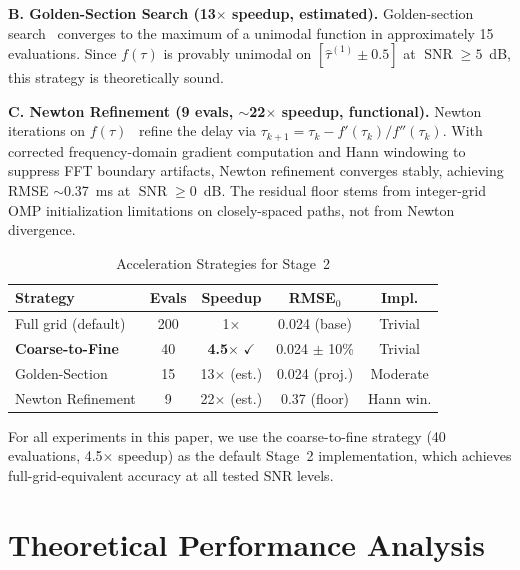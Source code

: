 \documentclass[a4paper,fleqn]{cas-dc}
\DeclareMathOperator{\SNR}{SNR}
\begin{document}
\textbf{B. Golden-Section Search (13$\times$ speedup, estimated).} Golden-section search~\cite{kiefer1953} converges to the maximum of a unimodal function in approximately 15 evaluations. Since $f(\tau)$ is provably unimodal on $[\hat{\tau}^{(1)} \pm 0.5]$ at $\SNR \ge 5$~dB, this strategy is theoretically sound.

\textbf{C. Newton Refinement (9 evals, $\sim$22$\times$ speedup, functional).} Newton iterations on $f(\tau)$~\cite{mamandipoor2016} refine the delay via $\tau_{k+1}=\tau_k - f'(\tau_k)/f''(\tau_k)$. With corrected frequency-domain gradient computation and Hann windowing to suppress FFT boundary artifacts, Newton refinement converges stably, achieving RMSE $\sim$0.37~ms at $\SNR\ge 0$~dB. The residual floor stems from integer-grid OMP initialization limitations on closely-spaced paths, not from Newton divergence.

\begin{table}[width=.9\linewidth,cols=5,pos=h]
\centering
\caption{Acceleration Strategies for Stage~2}
\label{tab:accel}
\footnotesize
\begin{tabular*}{\tblwidth}{@{}lcccc@{}}
\toprule
Strategy & Evals & Speedup & RMSE$_0$ & Impl. \\
\midrule
Full grid (default) & 200 & 1$\times$ & 0.024 (base) & Trivial \\
\textbf{Coarse-to-Fine} & 40 & \textbf{4.5}$\times$ $\checkmark$ & 0.024 $\pm$ 10\% & Trivial \\
Golden-Section & 15 & 13$\times$ (est.) & 0.024 (proj.) & Moderate \\
Newton Refinement & 9 & 22$\times$ (est.) & 0.37 (floor) & Hann win. \\
\bottomrule
\end{tabular*}
\end{table}

For all experiments in this paper, we use the coarse-to-fine strategy (40 evaluations, 4.5$\times$ speedup) as the default Stage~2 implementation, which achieves full-grid-equivalent accuracy at all tested SNR levels.

\section{Theoretical Performance Analysis}
\label{sec:theory}
\end{document}
